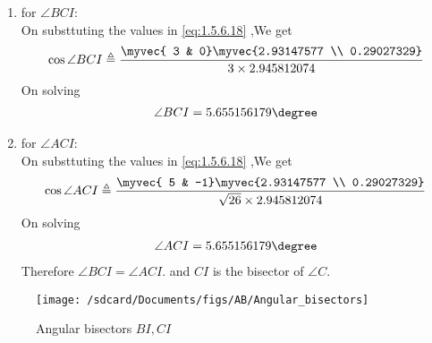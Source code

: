 \documentclass[11pt]{book}
\begin{document}
\begin{enumerate}[label=\thesection.\arabic*.,ref=\thesection.\theenumi]
\begin{enumerate}
\begin{enumerate}
    \item for $\angle BCI$: \\
    On substtuting the values in  \eqref{eq:1.5.6.18} ,We get 
    \begin{align}
        \cos{\angle BCI} \triangleq \frac{\myvec{ 3 & 0}\myvec{2.93147577 \\ 0.29027329}}{ 3 \times 2.945812074} \\
    \end{align}
    On solving 
    \begin{align}
        \angle BCI = 5.655156179 \degree
    \end{align}
       \item for $\angle ACI$: \\
    On substtuting the values in  \eqref{eq:1.5.6.18} ,We get 
    \begin{align}
        \cos{\angle ACI} \triangleq \frac{\myvec{ 5 & -1}\myvec{2.93147577 \\ 0.29027329}}{ \sqrt{26} \times 2.945812074} \\
    \end{align}
    On solving 
    \begin{align}
        \angle ACI = 5.655156179 \degree
    \end{align}
    Therefore $\angle BCI = \angle ACI.$ and $CI$ is the bisector of $\angle C$. 
\end{enumerate}
\begin{figure}[H]
\texttt{[image: /sdcard/Documents/figs/AB/Angular\_bisectors]}
\caption{Angular bisectors  $BI, CI$}
\label{fig:fig5}
\end{figure}
\end{enumerate}

\end{enumerate}
\end{document}
